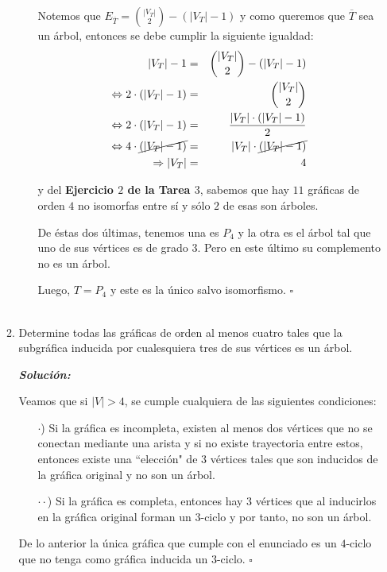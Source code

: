\documentclass{article}
\begin{document}
\begin{enumerate}
\begin{enumerate}
\begin{itemize}
            Notemos que $E_{\overline{T}} = {|V_T| \choose 2} - (|V_T| -1)$ y
            como queremos que $\overline{T}$ sea un árbol, entonces se debe cumplir
            la siguiente igualdad:
            \begin{eqnarray*}
              |V_T| -1 &=& {|V_T| \choose 2} - (|V_T| -1)\\
              \Leftrightarrow 2 \cdot (|V_T| -1) &=& {|V_T| \choose 2}\\
              \Leftrightarrow 2 \cdot (|V_T| -1) &=& \frac{|V_T| \cdot (|V_T| -1)}{2}\\
              \Leftrightarrow 4 \cdot \cancel{(|V_T| -1)} &=& |V_T| \cdot \cancel{(|V_T| -1)}\\
              \Rightarrow |V_T| &=& 4
            \end{eqnarray*}

            y del \textbf{Ejercicio $2$ de la Tarea $3$}, sabemos que hay $11$ gráficas
            de orden $4$ no isomorfas entre sí y sólo $2$ de esas son árboles.

            De \'estas dos \'ultimas, tenemos una es $P_4$ y la otra es el árbol
            tal que uno de sus vértices es de grado $3$. Pero en este último su
            complemento no es un árbol.

            Luego, $T = P_4$ y este es la único salvo isomorfismo.
            \hfill $\square$ \\
            \\
        \end{itemize}

      \item Determine todas las gr\'aficas de orden al
        menos cuatro tales que la subgr\'afica inducida por
        cualesquiera tres de sus v\'ertices es un \'arbol.

        \textbf{\textit{Soluci\'on:}}

        Veamos que si $|V| > 4$, se cumple cualquiera de las siguientes condiciones:
        \begin{itemize}
          \item[$\cdot$)] Si la gráfica es incompleta, existen al menos dos vértices
            que no se conectan mediante una arista y si no existe trayectoria entre estos,
            entonces existe una ``elección" de $3$ vértices tales que son inducidos de
            la gráfica original y no son un árbol.

          \item[$\cdot \cdot$)] Si la gráfica es completa, entonces hay $3$ vértices que
            al inducirlos en la gráfica original forman un $3$-ciclo y por tanto, no son un árbol.
        \end{itemize}
        De lo anterior la única gráfica que cumple con el enunciado es un $4$-ciclo
        que no tenga como gráfica inducida un $3$-ciclo.
        \hfill $\square$ \\
        \\
      \end{enumerate}
  \end{enumerate}
\end{document}
